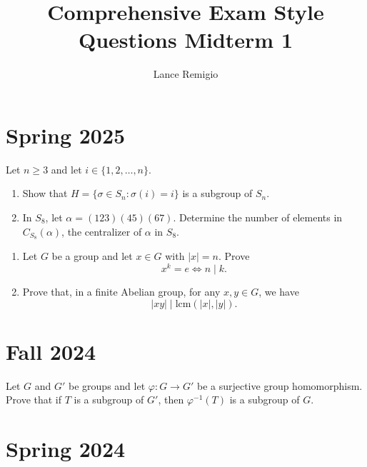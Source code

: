 \documentclass[a4paper]{article}
\title{Comprehensive Exam Style Questions Midterm 1}
\author{Lance Remigio}
\begin{document}
\maketitle

\section{Spring 2025}

\begin{problem}
   Let \( n \geq 3  \) and let \( i \in \{ 1,2,\dots, n \}  \). 
   \begin{enumerate}
       \item[(a)] Show that \( H = \{ \sigma \in {S}_{n} : \sigma (i) = i  \}   \) is a subgroup of \( {S}_{n} \).
        \item[(b)] In \( {S}_{8} \), let \( \alpha = (123)(45)(67) \). Determine the number of elements in \( {C}_{{S}_{8}}(\alpha) \), the centralizer of \( \alpha \) in \( {S}_{8} \).
   \end{enumerate}
\end{problem}

\begin{problem}
    \begin{enumerate}
        \item[(a)] Let \( G  \) be a group and let \( x \in G  \) with \( | x  |  = n  \). Prove 
            \[ x^{k} = e \iff n \mid k. \]
        \item[(b)] Prove that, in a finite Abelian group, for any \( x,y \in G  \), we have 
            \[  | x y  |  \mid \text{lcm}(| x  | , | y | ). \]
    \end{enumerate}
\end{problem}

\section{Fall 2024}

\begin{problem}
    Let \( G   \) and \( G' \) be groups and let \( \varphi : G \to G' \) be a surjective group homomorphism. Prove that if \( T  \) is a subgroup of \( G' \), then \( \varphi^{-1}(T) \) is a subgroup of \( G  \).
\end{problem}

\section{Spring 2024}
\end{document}
